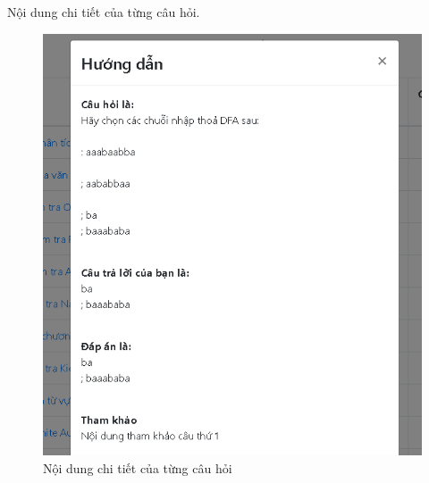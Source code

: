 Nội dung chi tiết của từng câu hỏi.

\begin{center}
	\begin{figure}[htp]
		\begin{center}
			\includegraphics[width=0.5\linewidth]{img/34}
		\end{center}
		\caption{Nội dung chi tiết của từng câu hỏi}
		\label{refhinh78}
	\end{figure}
\end{center}
